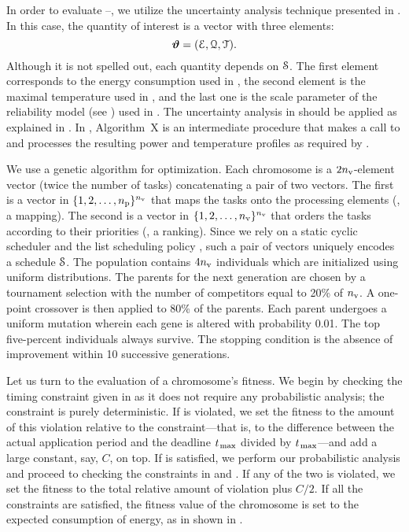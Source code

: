 In order to evaluate --, we utilize the uncertainty analysis technique presented in .
In this case, the quantity of interest is a vector with three elements:
\begin{equation} \elab{quantity-of-interest}
  \vw = (\qoiE, \qoiQ, \qoiT).
\end{equation}
Although it is not spelled out, each quantity depends on $\EuScript{S}$.
The first element corresponds to the energy consumption used in , the second element is the maximal temperature used in , and the last one is the scale parameter of the reliability model (see ) used in .
The uncertainty analysis in  should be applied as explained in .
In , Algorithm~X is an intermediate procedure that makes a call to  and processes the resulting power and temperature profiles as required by .

We use a genetic algorithm for optimization.
Each chromosome is a $2 {n_\text{v}}$-element vector (twice the number of tasks) concatenating a pair of two vectors.
The first is a vector in $\{ 1, 2, \dotsc, {n_\text{p}} \}^{n_\text{v}}$ that maps the tasks onto the processing elements (\ie, a mapping).
The second is a vector in $\{ 1, 2, \dotsc, {n_\text{v}} \}^{n_\text{v}}$ that orders the tasks according to their priorities (\ie, a ranking).
Since we rely on a static cyclic scheduler and the list scheduling policy \cite{adam1974}, such a pair of vectors uniquely encodes a schedule $\EuScript{S}$.
The population contains $4 {n_\text{v}}$ individuals which are initialized using uniform distributions.
The parents for the next generation are chosen by a tournament selection with the number of competitors equal to 20\% of ${n_\text{v}}$.
A one-point crossover is then applied to 80\% of the parents.
Each parent undergoes a uniform mutation wherein each gene is altered with probability 0.01.
The top five-percent individuals always survive.
The stopping condition is the absence of improvement within 10 successive generations.

Let us turn to the evaluation of a chromosome's fitness.
We begin by checking the timing constraint given in  as it does not require any probabilistic analysis; the constraint is purely deterministic.
If  is violated, we set the fitness to the amount of this violation relative to the constraint---that is, to the difference between the actual application period and the deadline $t_{\text{\kern0.1emmax}}$ divided by $t_{\text{\kern0.1emmax}}$---and add a large constant, say, $C$, on top.
If  is satisfied, we perform our probabilistic analysis and proceed to checking the constraints in  and .
If any of the two is violated, we set the fitness to the total relative amount of violation plus $C/2$.
If all the constraints are satisfied, the fitness value of the chromosome is set to the expected consumption of energy, as in shown in .

